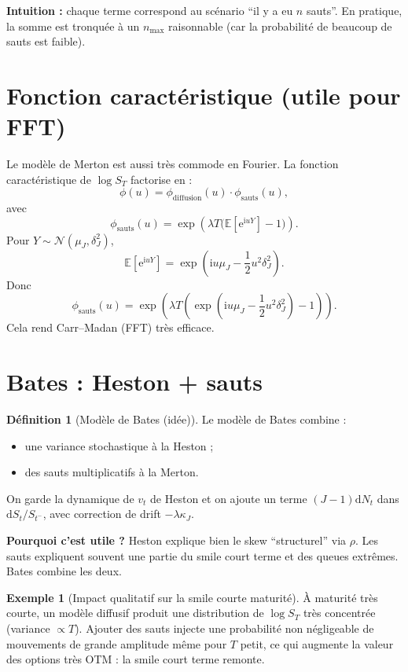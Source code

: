 \documentclass[11pt,a4paper]{report}
\newcommand{\dd}{\mathrm{d}}
\newcommand{\ee}{\mathrm{e}}
\newcommand{\ii}{\mathrm{i}}
\newcommand{\E}{\mathbb{E}}
\newcommand{\1}{\mathbbm{1}}
\newcommand{\Normal}{\mathcal{N}}
\theoremstyle{definition}
\newtheorem{definition}{Définition}[chapter]
\newtheorem{example}{Exemple}[chapter]
\theoremstyle{plain}
\theoremstyle{remark}
\begin{document}
\textbf{Intuition :} chaque terme correspond au scénario ``il y a eu $n$ sauts''.
En pratique, la somme est tronquée à un $n_{\max}$ raisonnable (car la probabilité de beaucoup de sauts est faible).

\section{Fonction caractéristique (utile pour FFT)}
Le modèle de Merton est aussi très commode en Fourier.
La fonction caractéristique de $\log S_T$ factorise en :
\[
\phi(u)=\phi_{\text{diffusion}}(u)\cdot \phi_{\text{sauts}}(u),
\]
avec
\[
\phi_{\text{sauts}}(u)=\exp\left(\lambda T\bigl(\E[\ee^{\ii u Y}]-1\bigr)\right).
\]
Pour $Y\sim \Normal(\mu_J,\delta_J^2)$,
\[
\E[\ee^{\ii u Y}] = \exp\left(\ii u\mu_J - \frac12 u^2\delta_J^2\right).
\]
Donc
\[
\phi_{\text{sauts}}(u)=\exp\left(\lambda T\left(\exp\left(\ii u\mu_J - \frac12 u^2\delta_J^2\right)-1\right)\right).
\]
Cela rend Carr--Madan (FFT) très efficace.

\section{Bates : Heston + sauts}
\begin{definition}[Modèle de Bates (idée)]
Le modèle de Bates combine :
\begin{itemize}
  \item une variance stochastique à la Heston ;
  \item des sauts multiplicatifs à la Merton.
\end{itemize}
On garde la dynamique de $v_t$ de Heston et on ajoute un terme $(J-1)\dd N_t$ dans $\dd S_t/S_{t^-}$,
avec correction de drift $-\lambda\kappa_J$.
\end{definition}

\textbf{Pourquoi c'est utile ?}
Heston explique bien le skew ``structurel'' via $\rho$.
Les sauts expliquent souvent une partie du smile court terme et des queues extrêmes.
Bates combine les deux.

\begin{example}[Impact qualitatif sur la smile courte maturité]
À maturité très courte, un modèle diffusif produit une distribution de $\log S_T$ très concentrée (variance $\propto T$).
Ajouter des sauts injecte une probabilité non négligeable de mouvements de grande amplitude même pour $T$ petit,
ce qui augmente la valeur des options très OTM : la smile court terme remonte.
\end{example}
\end{document}
